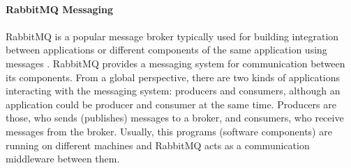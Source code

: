 \\
\textbf{RabbitMQ Messaging \cite{rabbit}}\\
\\
RabbitMQ is a popular message broker typically used for building integration between applications or different components of the same application using messages . RabbitMQ provides a messaging system for communication between its components. From a global perspective,  there are two kinds of applications interacting with the messaging system: producers and consumers, although an application could be producer and consumer at the same time. Producers are those, who sends (publishes) messages to a broker, and consumers, who receive messages from the broker. Usually, this programs (software components) are running on different machines and RabbitMQ acts as a communication middleware between them.
